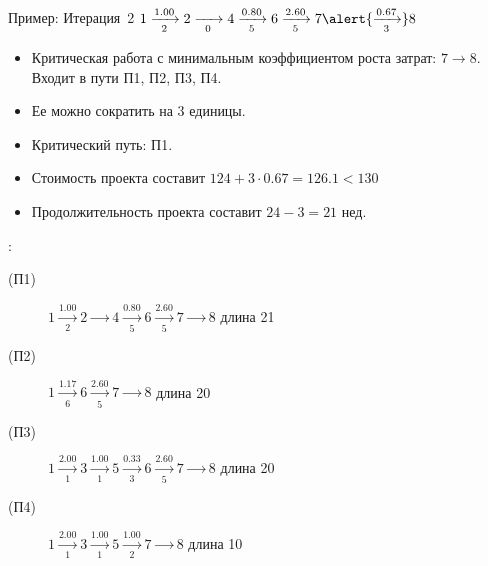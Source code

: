 \documentclass[unicode,11pt,notheorems]{beamer}
\begin{document}
\begin{frame}{Пример: Итерация~2}
	$1 \xrightarrow[2]{1.00}  2 \xrightarrow[0]{\phantom{0.25}} 4 \xrightarrow[5]{0.80} 6 \xrightarrow[5]{2.60} 7 \alert{\xrightarrow[3]{0.67}} 8$ 
	\begin{itemize}
	\item 
		Критическая работа с минимальным коэффициентом роста затрат:  $7 \to 8$.
		\hfill Входит в пути \alert{П1, П2, П3, П4}.			
	\item 
		Ее можно сократить на $3$ единицы.	
	\item 		
		Критический путь: П1.
	\item 
		Стоимость проекта составит $124+3\cdot 0.67=126.1< 130$
	\item 
		Продолжительность проекта составит $24-3=21$ нед.		
\end{itemize}
:
\begin{description}
\item[(П1)]
	\alert{$1 \xrightarrow[2]{1.00}  2 \xrightarrow[]{\phantom{0.25}} 4 \xrightarrow[5]{0.80} 6 \xrightarrow[5]{2.60} 7 \xrightarrow[]{\phantom{0.67}} 8$}
	\hfill{} длина 21
\item[(П2)] 
	$1 \xrightarrow[6]{1.17}  6 \xrightarrow[5]{2.60} 7  \xrightarrow[]{\phantom{0.67}} 8$
	\hfill{} длина 20
\item[(П3)] 
	$1 \xrightarrow[1]{2.00} 3 \xrightarrow[1]{1.00} 5 \xrightarrow[3]{0.33}  6 \xrightarrow[5]{2.60} 7  \xrightarrow[]{\phantom{0.67}} 8$
	\hfill{} длина 20
\item[(П4)] 
	$1 \xrightarrow[1]{2.00} 3 \xrightarrow[1]{1.00} 5 \xrightarrow[2]{1.00} 7  \xrightarrow[]{\phantom{0.67}} 8$
	\hfill{} длина 10
\end{description}

\end{frame}
\end{document}

